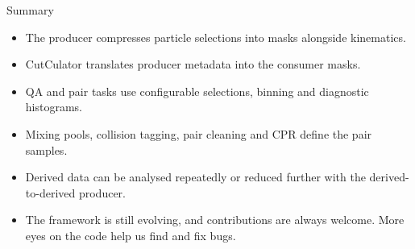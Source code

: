 \begin{frame}{Summary}
 \begin{itemize}
 \item The producer compresses particle selections into masks alongside kinematics.
 \item CutCulator translates producer metadata into the consumer masks.
 \item QA and pair tasks use configurable selections, binning and diagnostic histograms.
 \item Mixing pools, collision tagging, pair cleaning and CPR define the pair samples.
 \item Derived data can be analysed repeatedly or reduced further with the derived-to-derived producer.
 \item The framework is still evolving, and contributions are always welcome. More eyes on the code help us find and fix bugs.
 \end{itemize}
\end{frame}
